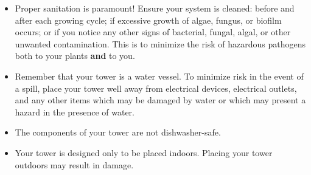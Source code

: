 \begin{itemize}
    \item Proper sanitation is paramount! Ensure your system is cleaned: before and after each growing cycle; if excessive growth of algae, fungus, or biofilm occurs; or if you notice any other signs of bacterial, fungal, algal, or other unwanted contamination. This is to minimize the risk of hazardous pathogens both to your plants \textbf{and} to you.
    \item Remember that your tower is a water vessel. To minimize risk in the event of a spill, place your tower well away from electrical devices, electrical outlets, and any other items which may be damaged by water or which may present a hazard in the presence of water.
    \item The components of your tower are not dishwasher-safe.
    \item Your tower is designed only to be placed indoors. Placing your tower outdoors may result in damage.
\end{itemize}
